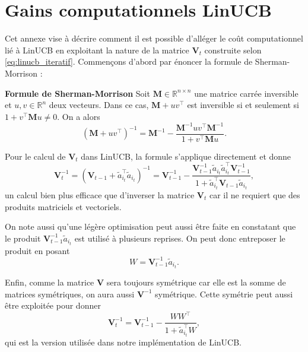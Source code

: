 \chapter{Gains computationnels LinUCB}     %
\label{chap:lincub_gains}                   %


Cet annexe vise à décrire comment il est possible d'alléger le coût computationnel
lié à LinUCB en exploitant la nature de la matrice $\mathbf{V}_t$ construite
selon \eqref{eq:linucb_iteratif}.
Commençons d'abord par énoncer la formule de Sherman-Morrison \citep{sherman1950adjustment}:

\textbf{Formule de Sherman-Morrison}
Soit $\mathbf{M} \in \mathbb{R}^{n \times n}$ une matrice carrée inversible et $u, v \in \mathbb{R}^n$
deux vecteurs.
Dans ce cas, $\mathbf{M} + uv^\top$ est inversible si et seulement si $1 + v^\top \mathbf{M}u \neq 0$.
On a alors
\begin{equation}
    \left(\mathbf{M} + uv^\top \right)^{-1} = \mathbf{M}^{-1} - \frac{\mathbf{M}^{-1}uv^\top\mathbf{M}^{-1}}{1 + v^\top \mathbf{M}u}.
    \label{eq:sherman_morrison}
\end{equation}

Pour le calcul de $\mathbf{V}_t$ dans LinUCB, la formule s'applique directement et
donne 
\begin{equation}
\mathbf{V}_t^{-1} =
\left(\mathbf{V}_{t-1} + \tilde{a}_{i_t}^\top \tilde{a}_{i_t} \right)^{-1} =
\mathbf{V}_{t-1}^{-1} - \frac{\mathbf{V}_{t-1}^{-1}\tilde{a}_{i_t}\tilde{a}_{i_t}^\top\mathbf{V}_{t-1}^{-1}}{1 + \tilde{a}_{i_t}^\top \mathbf{V}_{t-1}\tilde{a}_{i_t}},
\end{equation}
un calcul bien plus efficace que d'inverser la matrice $\mathbf{V}_t$ car il ne requiert 
que des produits matriciels et vectoriels.

On note aussi qu'une légère optimisation peut aussi être faite en constatant que 
le produit $\mathbf{V}^{-1}_{t-1}\tilde{a}_{i_t}$ est utilisé à plusieurs reprises.
On peut donc entreposer le produit en posant 
\begin{equation*}
W = \mathbf{V}^{-1}_{t-1}\tilde{a}_{i_t}.
\end{equation*}

Enfin, comme la matrice $\mathbf{V}$ sera toujours symétrique car elle est la 
somme de matrices symétriques, on aura aussi $\mathbf{V}^{-1}$ symétrique.
Cette symétrie peut aussi être exploitée pour donner 
\begin{equation}
    \mathbf{V}_t^{-1} =
    \mathbf{V}_{t-1}^{-1} - \frac{WW^\top}{1 + \tilde{a}_{i_t}^\top W},
\end{equation}
qui est la version utilisée dans notre implémentation de LinUCB.